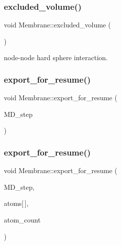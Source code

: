 \mbox{\label{classMembrane_a917057b75f5a7f766eb747daf40a1ef4}} 
\subsubsection{\texorpdfstring{excluded\_volume()}{excluded\_volume()}}
{\footnotesize\ttfamily void Membrane\+::excluded\+\_\+volume (\begin{DoxyParamCaption}\item[{void}]{ }\end{DoxyParamCaption})}



node-\/node hard sphere interaction. 

\mbox{\label{classMembrane_a45aaa9c0cbd3d22aa9b03e24480b69de}} 
\subsubsection{\texorpdfstring{export\_for\_resume()}{export\_for\_resume()}\hspace{0.1cm}{\footnotesize\ttfamily [1/2]}}
{\footnotesize\ttfamily void Membrane\+::export\+\_\+for\+\_\+resume (\begin{DoxyParamCaption}\item[{int}]{M\+D\+\_\+step }\end{DoxyParamCaption})}

\mbox{\label{classMembrane_a63f3fde05eafeab5c73bfcc416242f74}} 
\subsubsection{\texorpdfstring{export\_for\_resume()}{export\_for\_resume()}\hspace{0.1cm}{\footnotesize\ttfamily [2/2]}}
{\footnotesize\ttfamily void Membrane\+::export\+\_\+for\+\_\+resume (\begin{DoxyParamCaption}\item[{int}]{M\+D\+\_\+step,  }\item[{\mbox{\hyperlink{structMyAtomInfo}{My\+Atom\+Info}}}]{atoms\mbox{[}$\,$\mbox{]},  }\item[{int}]{atom\+\_\+count }\end{DoxyParamCaption})}

